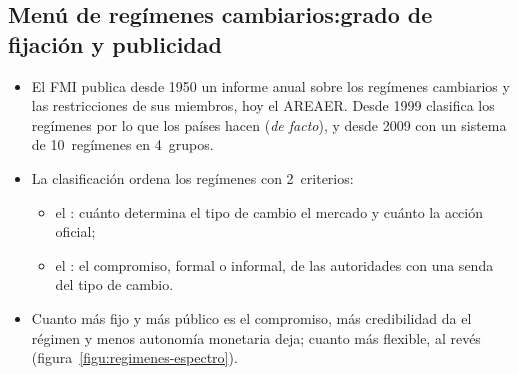 \documentclass[11pt]{article}
\begin{document}
\subsection{Menú de regímenes cambiarios:\cortetitulo grado de fijación y publicidad}\label{sec:menu}

\begin{itemize}
\item El FMI publica desde 1950 un informe anual sobre los regímenes cambiarios y las restricciones de sus miembros, hoy el AREAER. Desde 1999 clasifica los regímenes por lo que los países hacen (\emph{de facto}), y desde 2009 con un sistema de 10~regímenes en 4~grupos\nocite{HabermeierEtAl2009Revised,FMI2024AREAER2023}.
\item La clasificación ordena los regímenes con 2~criterios:
  \begin{itemize}
  \item el : cuánto determina el tipo de cambio el mercado y cuánto la acción oficial;
  \item el : el compromiso, formal o informal, de las autoridades con una senda del tipo de cambio.
  \end{itemize}
\item Cuanto más fijo y más público es el compromiso, más credibilidad da el régimen y menos autonomía monetaria deja; cuanto más flexible, al revés (figura~\ref{figu:regimenes-espectro}).
\end{itemize}

\begin{infografia}[H]
\centering
\caption{El menú de regímenes cambiarios del FMI: los 4~grupos y sus subtipos, del más rígido al más flexible}\label{figu:regimenes-espectro}
\end{infografia}
\end{document}
